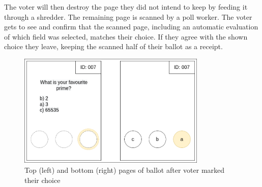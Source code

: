 The voter will then destroy the page they did not intend to keep by feeding it
through a shredder. The remaining page is scanned by a poll worker. The voter
gets to see and confirm that the scanned page, including an automatic
evaluation of which field was selected, matches their choice. If they agree
with the shown choice they leave, keeping the scanned half of their ballot as a
receipt.

\begin{figure}
\centering
\includegraphics[width=0.8\textwidth]{../resources/high_level_ballot_voted_split.drawio}
\caption{Top (left) and bottom (right) pages of ballot after voter marked their choice}
\label{fig:punchscan_ballot_voted}
\end{figure}
